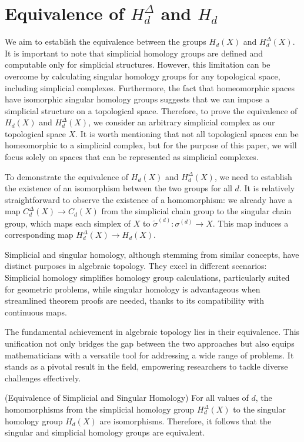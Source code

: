 \section{Equivalence of $H_d^\Delta$ and $H_d$}
We aim to establish the equivalence between the groups $H_d(X)$ and $H^\Delta_d(X)$. It is important to note that simplicial homology groups are defined and computable only for simplicial structures. However, this limitation can be overcome by calculating singular homology groups for any topological space, including simplicial complexes. Furthermore, the fact that homeomorphic spaces have isomorphic singular homology groups suggests that we can impose a simplicial structure on a topological space. Therefore, to prove the equivalence of $H_d(X)$ and $H^\Delta_d(X)$, we consider an arbitrary simplicial complex as our topological space $X$. It is worth mentioning that not all topological spaces can be homeomorphic to a simplicial complex, but for the purpose of this paper, we will focus solely on spaces that can be represented as simplicial complexes.

To demonstrate the equivalence of $H_d(X)$ and $H^\Delta_d(X)$, we need to establish the existence of an isomorphism between the two groups for all $d$. It is relatively straightforward to observe the existence of a homomorphism: we already have a map $C^\Delta_d(X) \rightarrow C_d(X)$ from the simplicial chain group to the singular chain group, which maps each simplex of $X$ to $\tilde{\sigma}^{(d)}: \sigma^{(d)} \rightarrow X$. This map induces a corresponding map $H^\Delta_d(X) \rightarrow H_d(X)$.

Simplicial and singular homology, although stemming from similar concepts, have distinct purposes in algebraic topology. They excel in different scenarios: Simplicial homology simplifies homology group calculations, particularly suited for geometric problems, while singular homology is advantageous when streamlined theorem proofs are needed, thanks to its compatibility with continuous maps.

The fundamental achievement in algebraic topology lies in their equivalence. This unification not only bridges the gap between the two approaches but also equips mathematicians with a versatile tool for addressing a wide range of problems. It stands as a pivotal result in the field, empowering researchers to tackle diverse challenges effectively.

\begin{theorem}{(Equivalence of Simplicial and Singular Homology)}
For all values of $d$, the homomorphisms from the simplicial homology group $H^\Delta_d(X)$ to the singular homology group $H_d(X)$ are isomorphisms. Therefore, it follows that the singular and simplicial homology groups are equivalent.
\end{theorem}

